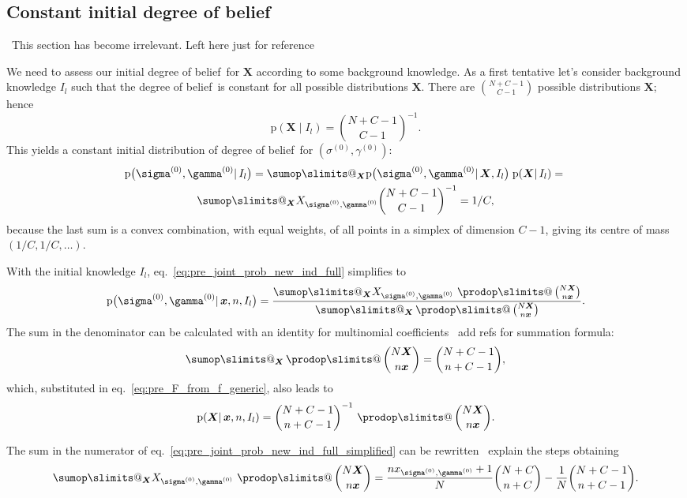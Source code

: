 \documentclass[\ifafour a4paper,12pt,\else a5paper,10pt,\fi%
onecolumn,oneside,article,%
british%
]{memoir}
\makeatletter
\theoremstyle{remark}
\theoremstyle{innote}
\def\sum{\DOTSI\sumop\slimits@}
\def\prod{\DOTSI\prodop\slimits@}
\newcommand*{\pf}{\mathrm{p}}%
\renewcommand*{\|}{\mathpunct{|}}
\newcommand*{\eqn}{eq.}%
\newcommand*{\tprod}{\mathop{\textstyle\prod}\nolimits}
\newcommand*{\puzzle}{\maltese}
\newcommand{\mynote}[1]{ {\color{notecolour}\puzzle\ #1}}
\newcommand*{\dob}{degree of belief}
\newcommand*{\yprod}{\tprod}
\newcommand*{\ys}{\sigma}
\newcommand*{\yg}{\gamma}
\newcommand*{\gn}{l}
\newcommand*{\ysi}[1]{\ys^{(#1)}}
\newcommand*{\ygi}[1]{\yg^{(#1)}}
\newcommand*{\yso}{\ysi{0}}
\newcommand*{\ygo}{\ygi{0}}
\newcommand*{\yF}{\bm{X}}
\newcommand*{\yf}{\bm{x}}
\newcommand*{\yIc}{I_{\gn}}
\makeatother
\begin{document}
\subsection*{Constant initial \dob}
\label{sec:pre_first_calc_const_prior}
\mynote{This section has become irrelevant. Left here just for reference}

We need to assess our initial \dob\ for $\yF$ according to some
background knowledge. As a first tentative let's consider background
knowledge $\yIc$ such that the \dob\ is constant for all possible
distributions $\yF$. There are $\binom{N+C-1}{C-1}$ possible distributions
$\yF$; hence
\begin{equation}
  \label{eq:pre_constant_prior}
  \pf(\yF \| \yIc) = \binom{N+C-1}{C-1}^{-1}.
\end{equation}
This yields a constant  initial  distribution of \dob\ for $(\yso,\ygo)$:
\begin{multline}
  \label{eq:pre_joint_prob_initial_F_unknown}
  \pf\bigl(\yso, \ygo \| \yIc\bigr)  =
  \sum_{\yF}  \pf\bigl(\yso, \ygo \| \yF,\yIc\bigr) \;
  \pf( \yF \| \yIc) ={}\\
  \sum_{\yF}  X_{\yso, \ygo} \binom{N+C-1}{C-1}^{-1}
  = 1/C,
\end{multline}
because the last sum is a convex combination, with equal weights, of all
points in a simplex of dimension $C-1$, giving its centre of mass
$(1/C, 1/C, \dotso)$.

With the initial knowledge $\yIc$,
\eqn~\eqref{eq:pre_joint_prob_new_ind_full} simplifies to
\begin{equation}
    \label{eq:pre_joint_prob_new_ind_full_simplified}
  \pf\bigl(\yso, \ygo \| \yf, n,\yIc\bigr)  =
  \frac{
    \sum_{\yF} X_{\yso, \ygo}\,
    \yprod\binom{N\yF}{n\yf}}{
  \sum_{\yF} \yprod\binom{N\yF}{n\yf}}.
\end{equation}
The sum in the denominator can be calculated with an identity for
multinomial coefficients\mynote{add
  refs for summation formula}:
\begin{equation}
  \label{eq:pre_multinomial_sum_identity}
  \sum_{\yF} \yprod\binom{N\yF}{n\yf} = \binom{N+C-1}{n+C-1},
\end{equation}
which, substituted in \eqn~\eqref{eq:pre_F_from_f_generic}, also leads to
\begin{equation}
  \label{eq:pre_F_from_f_specific}
  \pf(\yF \| \yf, n, \yIc) = \binom{N+C-1}{n+C-1}^{-1}\,\yprod\binom{N\yF}{n\yf}.
\end{equation}

The sum in the numerator of
\eqn~\eqref{eq:pre_joint_prob_new_ind_full_simplified} can be
rewritten\mynote{explain the steps} obtaining
\begin{equation}
  \label{eq:pre_numerator_constant_prior}
  \sum_{\yF} X_{\yso, \ygo}\, \yprod\binom{N\yF}{n\yf}
  =
  \frac{n x_{\yso, \ygo}+1}{N} \binom{N+C}{n+C}
  - \frac{1}{N}\binom{N+C-1}{n+C-1}.
\end{equation}
\end{document}

